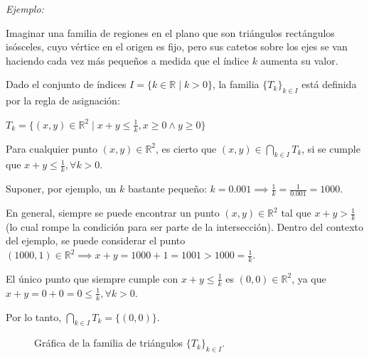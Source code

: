 \documentclass{article}
\begin{document}
\textit{Ejemplo:}

Imaginar una familia de regiones en el plano que son triángulos rectángulos isósceles, cuyo vértice en el origen es fijo, pero sus catetos sobre los ejes se van haciendo cada vez más pequeños a medida que el índice $k$ aumenta su valor.

Dado el conjunto de índices $I = \{k \in \mathbb{R} \mid k > 0\}$, la familia $\{T_k\}_{k \in I}$ está definida por la regla de asignación:

$T_k = \{(x, y) \in \mathbb{R}^2 \mid x + y \le \frac{1}{k}, x \ge 0 \land y \ge 0\}$

Para cualquier punto $(x, y) \in \mathbb{R}^2$, es cierto que $(x, y) \in \bigcap_{k \in I} T_k$, si se cumple que $x + y \le \frac{1}{k}, \forall k > 0$.

Suponer, por ejemplo, un $k$ bastante pequeño: $k = 0.001 \implies \frac{1}{k} = \frac{1}{0.001} = 1000$.

En general, siempre se puede encontrar un punto $(x, y) \in \mathbb{R}^2$ tal que $x + y > \frac{1}{k}$ (lo cual rompe la condición para ser parte de la intersección). Dentro del contexto del ejemplo, se puede considerar el punto $(1000, 1) \in \mathbb{R}^2 \implies x + y = 1000 + 1 = 1001 > 1000 = \frac{1}{k}$.

El único punto que siempre cumple con $x + y \le \frac{1}{k}$ es $(0, 0) \in \mathbb{R}^2$, ya que $x + y = 0 + 0 = 0 \le \frac{1}{k}, \forall k > 0$.

Por lo tanto, $\bigcap_{k \in I} T_k = \{(0, 0)\}$.

\begin{figure}[H]
\centering
{}
\caption{Gráfica de la familia de triángulos $\{T_k\}_{k \in I}$.}
\end{figure}
\end{document}

